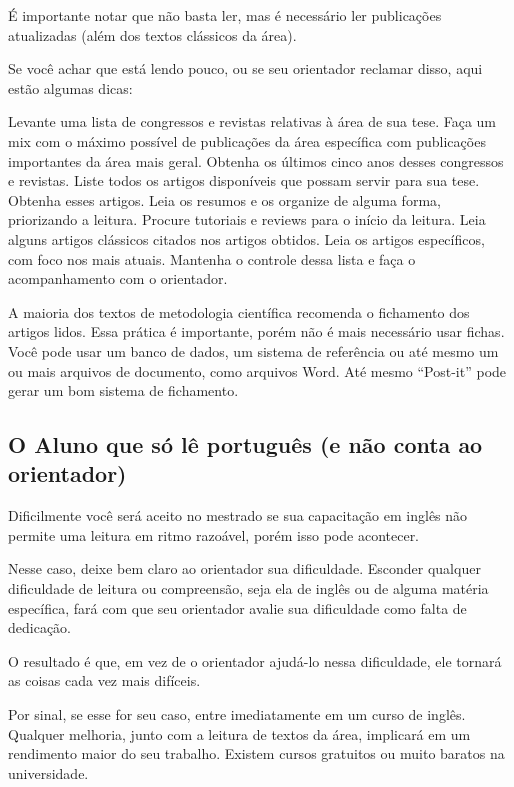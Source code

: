É importante notar que não basta ler, mas é necessário ler publicações atualizadas (além dos textos clássicos da área).


Se você achar que está lendo pouco, ou se seu orientador reclamar disso, aqui estão algumas dicas:

\begin{outline}	
\1	Levante uma lista de congressos e revistas relativas à área de sua tese.
\2	Faça um mix com o máximo possível de publicações da área específica com publicações importantes da área mais geral.
\1	Obtenha os últimos cinco anos desses congressos e revistas.
\1	Liste todos os artigos disponíveis que possam servir para sua tese.
\1	Obtenha esses artigos.
\1	Leia os resumos e os organize de alguma forma, priorizando a leitura.
\2	Procure tutoriais e reviews para o início da leitura.
\2	Leia alguns artigos clássicos citados nos artigos obtidos.
\2 Leia os artigos específicos, com foco nos mais atuais.
\1	Mantenha o controle dessa lista e faça o acompanhamento com o orientador.
\end{outline}

A maioria dos textos de metodologia científica recomenda o fichamento dos artigos lidos. Essa prática é importante, porém não é mais necessário usar fichas. Você pode usar um banco de dados, um sistema de referência ou até mesmo um ou mais arquivos de documento, como arquivos Word. Até mesmo “Post-it” pode gerar um bom sistema de fichamento. 


\subsection{O Aluno que só lê português (e não conta ao orientador)}


Dificilmente você será aceito no mestrado se sua capacitação em inglês não permite uma leitura em ritmo razoável, porém isso pode acontecer.


Nesse caso, deixe bem claro ao orientador sua dificuldade. Esconder qualquer dificuldade de leitura ou compreensão, seja ela de inglês ou de alguma matéria específica, fará com que seu orientador avalie sua dificuldade como falta de dedicação.


O resultado é que, em vez de o orientador ajudá-lo nessa dificuldade, ele tornará as coisas cada vez mais difíceis.


Por sinal, se esse for seu caso, entre imediatamente em um curso de inglês. Qualquer melhoria, junto com a leitura de textos da área, implicará em um rendimento maior do seu trabalho. Existem cursos gratuitos ou muito baratos na universidade.


